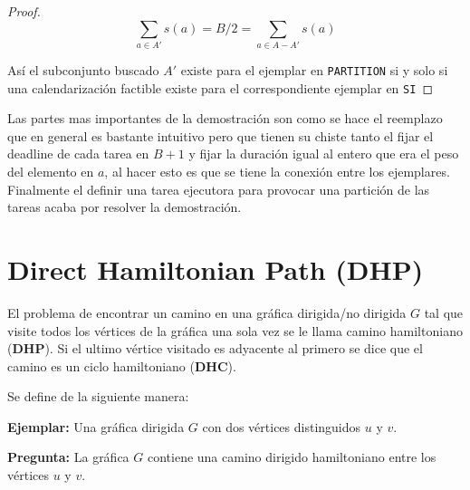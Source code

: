 \documentclass{article}
\begin{document}
\begin{proof}
  \begin{equation*}
    \sum_{a \in A'} s(a) = B / 2 = \sum_{a \in A - A'} s(a)
  \end{equation*}

  Así el subconjunto buscado $A'$ existe para el ejemplar en \texttt{PARTITION} si y solo si una calendarización factible existe para el correspondiente ejemplar en \texttt{SI}
\end{proof}

Las partes mas importantes de la demostración son como se hace el reemplazo que en general es bastante intuitivo pero que tienen su chiste tanto el fijar el deadline de cada tarea en $B + 1$ y fijar la duración igual al entero que era el peso del elemento en $a$, al hacer esto es que se tiene la conexión entre los ejemplares. Finalmente el definir una tarea ejecutora para provocar una partición de las tareas acaba por resolver la demostración.

\section{Direct Hamiltonian Path (DHP)}
El problema de encontrar un camino en una gráfica dirigida/no dirigida $G$ tal que visite todos los vértices de la gráfica una sola vez se le llama camino hamiltoniano (\textbf{DHP}). Si el ultimo vértice visitado es adyacente al primero se dice que el camino es un ciclo hamiltoniano (\textbf{DHC}).

Se define de la siguiente manera:

\textbf{Ejemplar:}
Una gráfica dirigida $G$ con dos vértices distinguidos $u$ y $v$.

\textbf{Pregunta:}
La gráfica $G$ contiene una camino dirigido hamiltoniano entre los vértices $u$ y $v$.
\end{document}
